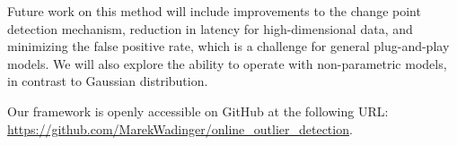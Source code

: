 Future work on this method will include improvements to the change point detection mechanism, reduction in latency for high-dimensional data, and minimizing the false positive rate, which is a challenge for general plug-and-play models. We will also explore the ability to operate with non-parametric models, in contrast to Gaussian distribution.

Our framework is openly accessible on GitHub at the following URL: \url{https://github.com/MarekWadinger/online_outlier_detection}.
